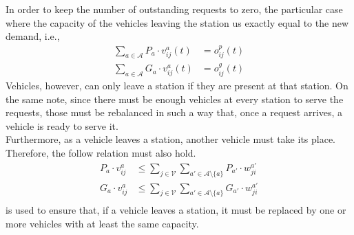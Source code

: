 In order to keep the number of outstanding requests to zero, the particular case where the capacity of the vehicles leaving the station us exactly equal to the new demand, i.e.,
\begin{equation}
	\begin{aligned}
		\sum_{a \in \mathcal{A}} P_a\cdot v^a_{ij}(t) &=  o^p_{ij}(t) \\
		\sum_{a \in \mathcal{A}} G_a \cdot v^a_{ij}(t) &=  o^g_{ij}(t)
	\end{aligned}
	\label{eq:no_more_than_request_f}
\end{equation}
Vehicles, however, can only leave a station if they are present at that station. On the same note, since there must be enough vehicles at every station to serve the requests, those must be rebalanced in such a way that, once a request arrives, a vehicle is ready to serve it. \\
 Furthermore, as a vehicle leaves a station, another vehicle must take its place. Therefore, the follow relation must also hold. 
 \begin{equation}
 	\begin{aligned}
 		P_a\cdot v^a_{ij} &\leq \sum_{j \in\mathcal{V}} \sum_{a'\in \mathcal{A} \setminus \{a\}}P_{a'}\cdot	w^{a'}_{ji}\\
 		G_a\cdot v^a_{ij} &\leq \sum_{j \in\mathcal{V}} \sum_{a'\in \mathcal{A} \setminus \{a\}}G_{a'}\cdot w^{a'}_{ji}\\
 	\end{aligned}
 	\label{eq:replace_vehicle}
 \end{equation}
 is used to ensure that, if a vehicle leaves a station, it must be replaced by one or more vehicles with at least the same capacity.\\

